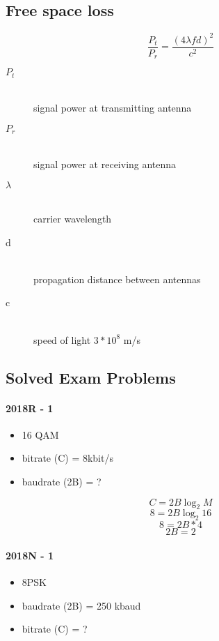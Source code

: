 \documentclass[../resumosRCOM.tex]{subfiles}
\begin{document}
\subsection{Free space loss}

\begin{equation}
    \frac{P_t}{P_r}=\frac{(4\lambda fd)^2}{c^2}
\end{equation}

\begin{description}
    \item[\(P_t\)] \hfill \\ signal power at transmitting antenna
    \item[\(P_r\)] \hfill \\ signal power at receiving antenna
    \item[\(\lambda\)] \hfill \\ carrier wavelength
    \item[d] \hfill \\ propagation distance between antennas
    \item[c] \hfill \\ speed of light \(3 * 10^8 \) m/s 
\end{description}

\subsection{Solved Exam Problems}
\paragraph{2018R - 1}
\begin{itemize}
    \item 16 QAM
    \item bitrate (C) = 8kbit/s
    \item baudrate (2B) = ?
\end{itemize}

\[C = 2B\log_2 M\]
\[8 = 2B\log_2 16\]
\[8 = 2B*4\]
\[2B = 2\]

\paragraph{2018N - 1}
\begin{itemize}
    \item 8PSK
    \item baudrate (2B) = 250 kbaud
    \item bitrate (C) = ?
\end{itemize}
\end{document}
